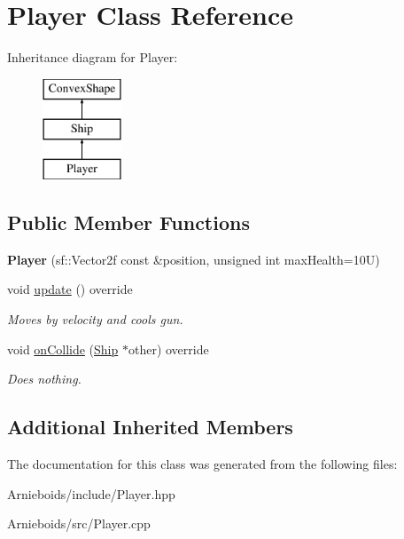 \hypertarget{class_player}{}\section{Player Class Reference}
\label{class_player}
Inheritance diagram for Player\+:\begin{figure}[H]
\begin{center}
\leavevmode
\includegraphics[height=3.000000cm]{class_player}
\end{center}
\end{figure}
\subsection*{Public Member Functions}
\begin{DoxyCompactItemize}
\item 
\hypertarget{class_player_aac1c48b82a1e579cae0f93482f1c6a22}{}{\bfseries Player} (sf\+::\+Vector2f const \&position, unsigned int max\+Health=10\+U)\label{class_player_aac1c48b82a1e579cae0f93482f1c6a22}

\item 
\hypertarget{class_player_a6912bb6e48efb5845d59f0f4582827ef}{}void \hyperlink{class_player_a6912bb6e48efb5845d59f0f4582827ef}{update} () override\label{class_player_a6912bb6e48efb5845d59f0f4582827ef}

\begin{DoxyCompactList}\small\item\em Moves by velocity and cools gun. \end{DoxyCompactList}\item 
\hypertarget{class_player_a4f7cc374f991211ccc547f66dd6bcd13}{}void \hyperlink{class_player_a4f7cc374f991211ccc547f66dd6bcd13}{on\+Collide} (\hyperlink{class_ship}{Ship} $\ast$other) override\label{class_player_a4f7cc374f991211ccc547f66dd6bcd13}

\begin{DoxyCompactList}\small\item\em Does nothing. \end{DoxyCompactList}\end{DoxyCompactItemize}
\subsection*{Additional Inherited Members}


The documentation for this class was generated from the following files\+:\begin{DoxyCompactItemize}
\item 
Arnieboids/include/Player.\+hpp\item 
Arnieboids/src/Player.\+cpp\end{DoxyCompactItemize}
